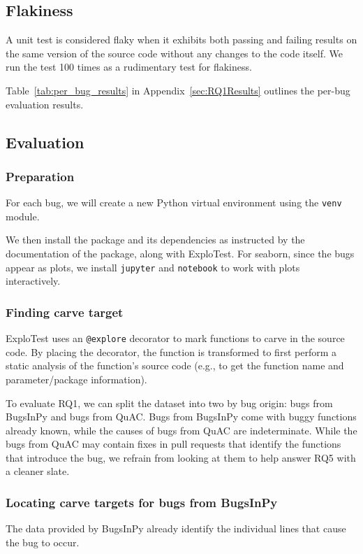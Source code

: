 \subsection{Flakiness}
A unit test is considered flaky when it exhibits both passing and failing results on the same version of the
source code without any changes to the
code itself. We run the test 100 times as a rudimentary test for flakiness.

Table~\ref{tab:per_bug_results} in Appendix~\ref{sec:RQ1Results} outlines the per-bug evaluation results.


%
\subsection{Evaluation}

\subsubsection{Preparation}
For each bug, we will create a new Python virtual environment using the \verb|venv| module.


We then install the package and its dependencies as instructed by the documentation of the package, along
with ExploTest. For seaborn, since the bugs
appear as plots, we install \verb|jupyter| and \verb|notebook| to work with plots interactively.

\subsubsection{Finding carve target}
ExploTest uses an \verb|@explore| decorator to mark functions to carve in the source code. By placing the
decorator, the function is transformed to
first perform a static analysis of the function's source code (e.g., to get the function name and
parameter/package information).

To evaluate RQ1, we can split the dataset into two by bug origin: bugs from BugsInPy and bugs from QuAC. Bugs
from BugsInPy come with buggy functions
already known, while the causes of bugs from QuAC are indeterminate. While the bugs from QuAC may contain
fixes in pull requests that identify the
functions that introduce the bug, we refrain from looking at them to help answer RQ5 with a cleaner slate.

\subsubsection{Locating carve targets for bugs from BugsInPy}
The data provided by BugsInPy already identify the individual lines that cause the bug to occur.

